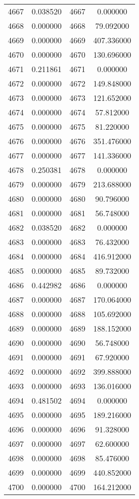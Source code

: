 \documentclass[12pt]{article}
\begin{document}
\begin{longtable}{@{}cccc@{}}
4667 & 0.038520 & 4667 & 0.000000 \\
4668 & 0.000000 & 4668 & 79.092000 \\
4669 & 0.000000 & 4669 & 407.336000 \\
4670 & 0.000000 & 4670 & 130.696000 \\
4671 & 0.211861 & 4671 & 0.000000 \\
4672 & 0.000000 & 4672 & 149.848000 \\
4673 & 0.000000 & 4673 & 121.652000 \\
4674 & 0.000000 & 4674 & 57.812000 \\
4675 & 0.000000 & 4675 & 81.220000 \\
4676 & 0.000000 & 4676 & 351.476000 \\
4677 & 0.000000 & 4677 & 141.336000 \\
4678 & 0.250381 & 4678 & 0.000000 \\
4679 & 0.000000 & 4679 & 213.688000 \\
4680 & 0.000000 & 4680 & 90.796000 \\
4681 & 0.000000 & 4681 & 56.748000 \\
4682 & 0.038520 & 4682 & 0.000000 \\
4683 & 0.000000 & 4683 & 76.432000 \\
4684 & 0.000000 & 4684 & 416.912000 \\
4685 & 0.000000 & 4685 & 89.732000 \\
4686 & 0.442982 & 4686 & 0.000000 \\
4687 & 0.000000 & 4687 & 170.064000 \\
4688 & 0.000000 & 4688 & 105.692000 \\
4689 & 0.000000 & 4689 & 188.152000 \\
4690 & 0.000000 & 4690 & 56.748000 \\
4691 & 0.000000 & 4691 & 67.920000 \\
4692 & 0.000000 & 4692 & 399.888000 \\
4693 & 0.000000 & 4693 & 136.016000 \\
4694 & 0.481502 & 4694 & 0.000000 \\
4695 & 0.000000 & 4695 & 189.216000 \\
4696 & 0.000000 & 4696 & 91.328000 \\
4697 & 0.000000 & 4697 & 62.600000 \\
4698 & 0.000000 & 4698 & 85.476000 \\
4699 & 0.000000 & 4699 & 440.852000 \\
4700 & 0.000000 & 4700 & 164.212000 \\

\end{longtable}
\end{document}
